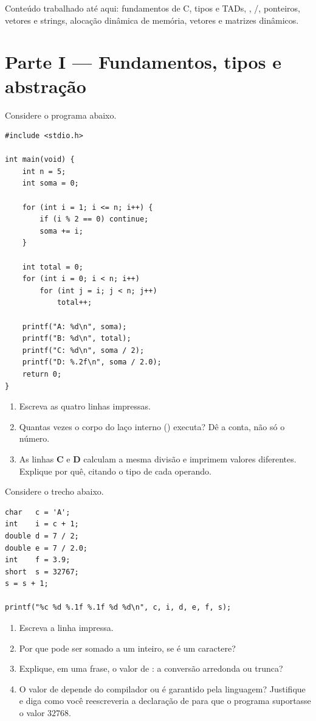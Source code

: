 \documentclass[11pt,a4paper]{article}
\begin{document}
     {Conteúdo trabalhado até aqui: fundamentos de C, tipos e TADs, ,
      /, ponteiros, vetores e strings, alocação dinâmica de
      memória, vetores e matrizes dinâmicos.}

\section{Parte I --- Fundamentos, tipos e abstração}

Considere o programa abaixo.

\begin{lstlisting}
#include <stdio.h>

int main(void) {
    int n = 5;
    int soma = 0;

    for (int i = 1; i <= n; i++) {
        if (i % 2 == 0) continue;
        soma += i;
    }

    int total = 0;
    for (int i = 0; i < n; i++)
        for (int j = i; j < n; j++)
            total++;

    printf("A: %d\n", soma);
    printf("B: %d\n", total);
    printf("C: %d\n", soma / 2);
    printf("D: %.2f\n", soma / 2.0);
    return 0;
}
\end{lstlisting}

\begin{enumerate}[label=(\alph*),leftmargin=1.8em,itemsep=1pt]
  \item Escreva as quatro linhas impressas.
  \item Quantas vezes o corpo do laço interno () executa? Dê a conta,
        não só o número.
  \item As linhas \textbf{C} e \textbf{D} calculam a mesma divisão e imprimem
        valores diferentes. Explique por quê, citando o tipo de cada operando.
\end{enumerate}

Considere o trecho abaixo.

\begin{lstlisting}
char   c = 'A';
int    i = c + 1;
double d = 7 / 2;
double e = 7 / 2.0;
int    f = 3.9;
short  s = 32767;
s = s + 1;

printf("%c %d %.1f %.1f %d %d\n", c, i, d, e, f, s);
\end{lstlisting}

\begin{enumerate}[label=(\alph*),leftmargin=1.8em,itemsep=1pt]
  \item Escreva a linha impressa.
  \item Por que  pode ser somado a um inteiro, se  é um caractere?
  \item Explique, em uma frase, o valor de : a conversão arredonda ou trunca?
  \item O valor de  depende do compilador ou é garantido pela linguagem?
        Justifique e diga como você reescreveria a declaração de  para que o
        programa suportasse o valor $32768$.
\end{enumerate}
\end{document}
